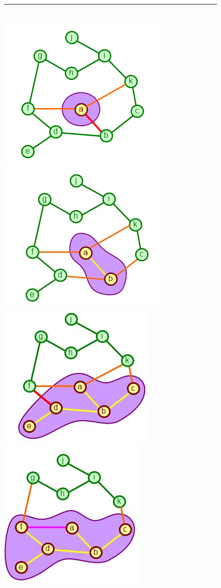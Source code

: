 \documentclass[a4paper]{exam}
\begin{document}
\begin{questions}
\begin{figure}
\begin{center}
    \rule{300pt}{.5pt}\\
    \includegraphics[scale=0.6]{a}
    \includegraphics[scale=0.6]{b}
    \includegraphics[scale=0.6]{c}
    \includegraphics[scale=0.6]{d}      

\end{center}
\end{figure}
\end{questions}
\end{document}
